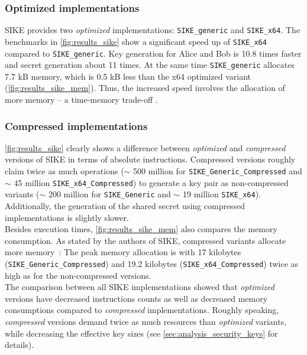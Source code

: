 \subsubsection{Optimized implementations}
\gls{SIKE} provides two \textit{optimized} implementations: \texttt{SIKE\_generic} and \texttt{SIKE\_x64}. The benchmarks in \autoref{fig:results_sike} show a significant speed up of \texttt{SIKE\_x64} compared to \texttt{SIKE\_generic}. Key generation for Alice and Bob is 10.8 times faster and secret generation about 11 times. At the same time \texttt{SIKE\_generic} allocates 7.7 \gls{kB} memory, which is 0.5 \gls{kB} less than the x64 optimized variant (\autoref{fig:results_sike_mem}). Thus, the increased speed involves the allocation of more memory -- a time-memory trade-off \parencite{1056220}.

\subsubsection{Compressed implementations}
\autoref{fig:results_sike} clearly shows a difference between \textit{optimized} and \textit{compressed} versions of \gls{SIKE} in terms of absolute instructions. Compressed versions roughly claim twice as much operations ($\sim$ 500 million for \texttt{SIKE\_Generic\_Compressed} and $\sim$ 45 million \texttt{SIKE\_x64\_Compressed}) to generate a key pair as non-compressed variants ($\sim$ 200 million for \texttt{SIKE\_Generic} and $\sim$ 19 million \texttt{SIKE\_x64}). Additionally, the generation of the shared secret  using compressed implementations is slightly slower.\\
Besides execution times, \autoref{fig:results_sike_mem} also compares the memory consumption. As stated by the authors of \gls{SIKE}, compressed variants allocate more memory~\parencite{sike2020spec}: The peak memory allocation is with 17 kilobytes (\texttt{SIKE\_Generic\_Compressed}) and 19.2 kilobytes (\texttt{SIKE\_x64\_Compressed}) twice as high as for the non-compressed versions.\\
The comparison between all \gls{SIKE} implementations showed that \textit{optimized} versions have decreased instructions counts as well as decreased memory consumptions compared to \textit{compressed} implementations. Roughly speaking, \textit{compressed} versions demand twice as much resources than \textit{optimized} variants, while decreasing the effective key sizes (see \autoref{sec:analysis_security_keys} for details).



